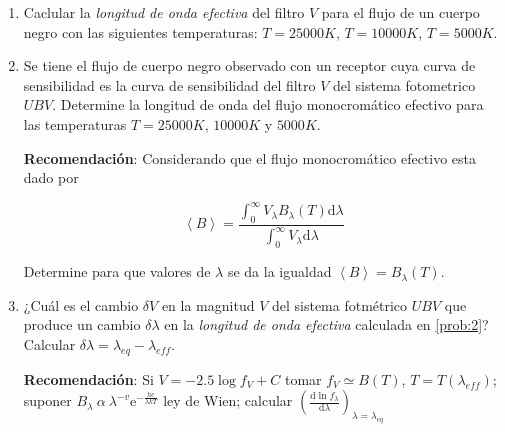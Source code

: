 \documentclass[12pt,spanish,a4paper]{practice}
\begin{document}
\begin{enumerate}[wide, labelwidth=!, labelindent=0pt, label=\textbf{\textrm{\arabic*)}}, ref=\arabic*]
    \item \label{prob:2} Caclular la \emph{longitud de onda efectiva} del filtro $V$ para el flujo de un cuerpo negro con las siguientes temperaturas: $T = 25000 K$, $T = 10000 K$, $T = 5000 K$.

    \item \label{prob:3} Se tiene el flujo de cuerpo negro observado con un receptor cuya curva de sensibilidad es la curva de sensibilidad del filtro $V$ del sistema fotometrico $UBV$. Determine la longitud de onda del flujo monocromático efectivo para las temperaturas $T = 25000 K$, $10000 K$ y $5000 K$.

    \textbf{Recomendación}:
        Considerando que el flujo monocromático efectivo esta dado por

        $$\left\langle B\right\rangle = \frac{\displaystyle{\int_{0}^{\infty} V_{\lambda} B_{\lambda} \left(T\right) \mathrm{d}\lambda}}{\displaystyle{\int_{0}^{\infty} V_{\lambda} \mathrm{d}\lambda}}$$

        Determine para que valores de $\lambda$ se da la igualdad $\left\langle B\right\rangle = B_{\lambda} \left(T\right)$.


    \item \label{prob:4} ¿Cuál es el cambio $\delta V$ en la magnitud $V$ del sistema fotmétrico $UBV$ que produce un cambio $\delta\lambda$ en la \emph{longitud de onda efectiva} calculada en \ref{prob:2}? Calcular $\delta\lambda = {\lambda}_{eq} - {\lambda}_{eff}$.

    \textbf{Recomendación}:
        Si $V = -2.5 \log f_V + C$ tomar $f_V \simeq B\left(T\right) $, $T=T\left({\lambda}_{eff}\right)$; suponer $B_{\lambda}\ \alpha\ {\lambda}^{-v} \mathrm{e}^{-\frac{hc}{\lambda k T}}$ ley de Wien; calcular $\left(\frac{\mathrm{d} \ln {f}_{\lambda}}{\mathrm{d}\lambda}\right)_{\lambda = {\lambda}_{eq}}$


\end{enumerate}
\end{document}
